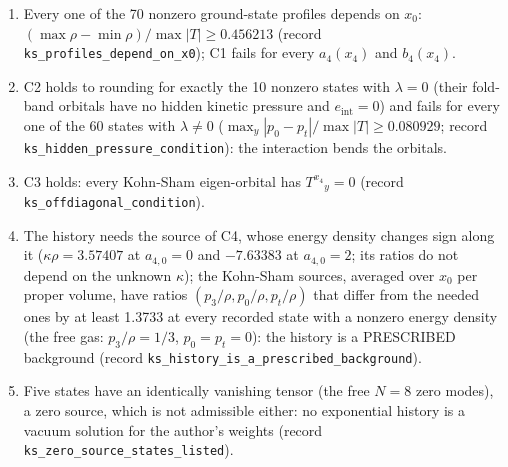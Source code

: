 \documentclass[11pt]{article}
\begin{document}
\begin{enumerate}
\item Every one of the 70 nonzero ground-state profiles depends on $x_0$: $(\max\rho - \min\rho)/\max|T| \geq 0.456213$ (record \texttt{ks\_profi\allowbreak{}les\_depe\allowbreak{}nd\_on\_x0}); C1 fails for every $a_4(x_4)$ and $b_4(x_4)$.
\item C2 holds to rounding for exactly the 10 nonzero states with $\lambda = 0$ (their fold-band orbitals have no hidden kinetic pressure and $e_{\mathrm{int}} = 0$) and fails for every one of the 60 states with $\lambda \neq 0$ ($\max_y|p_0 - p_t|/\max|T| \geq 0.080929$; record \texttt{ks\_hidde\allowbreak{}n\_pressu\allowbreak{}re\_condi\allowbreak{}tion}): the interaction bends the orbitals.
\item C3 holds: every Kohn-Sham eigen-orbital has $T^{x_4}{}_y = 0$ (record \texttt{ks\_offdi\allowbreak{}agonal\_c\allowbreak{}ondition}).
\item The history needs the source of C4, whose energy density changes sign along it ($\kappa\rho = 3.57407$ at $a_{4,0} = 0$ and $-7.63383$ at $a_{4,0} = 2$; its ratios do not depend on the unknown $\kappa$); the Kohn-Sham sources, averaged over $x_0$ per proper volume, have ratios $(p_3/\rho, p_0/\rho, p_t/\rho)$ that differ from the needed ones by at least 1.3733 at every recorded state with a nonzero energy density (the free gas: $p_3/\rho = 1/3$, $p_0 = p_t = 0$): the history is a PRESCRIBED background (record \texttt{ks\_histo\allowbreak{}ry\_is\_a\_\allowbreak{}prescrib\allowbreak{}ed\_backg\allowbreak{}round}).
\item Five states have an identically vanishing tensor (the free $N = 8$ zero modes), a zero source, which is not admissible either: no exponential history is a vacuum solution for the author's weights (record \texttt{ks\_zero\_\allowbreak{}source\_s\allowbreak{}tates\_li\allowbreak{}sted}).
\end{enumerate}
\end{document}
